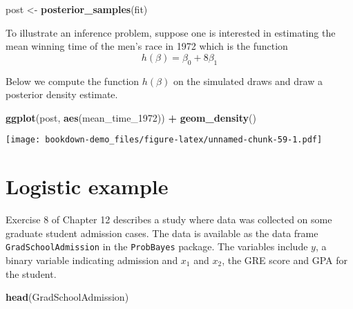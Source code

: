 \documentclass[
]{book}
\newenvironment{Shaded}{\begin{snugshade}}{\end{snugshade}}
\newcommand{\DataTypeTok}[1]{\textcolor[rgb]{0.13,0.29,0.53}{#1}}
\newcommand{\DecValTok}[1]{\textcolor[rgb]{0.00,0.00,0.81}{#1}}
\newcommand{\KeywordTok}[1]{\textcolor[rgb]{0.13,0.29,0.53}{\textbf{#1}}}
\newcommand{\NormalTok}[1]{#1}
\newcommand{\OperatorTok}[1]{\textcolor[rgb]{0.81,0.36,0.00}{\textbf{#1}}}
\newcommand{\StringTok}[1]{\textcolor[rgb]{0.31,0.60,0.02}{#1}}
\begin{document}
\begin{Shaded}
\begin{Highlighting}[]
\NormalTok{post <-}\StringTok{ }\KeywordTok{posterior_samples}\NormalTok{(fit)}
\end{Highlighting}
\end{Shaded}

To illustrate an inference problem, suppose one is interested in estimating the mean winning time of the men's race in 1972 which is the function
\[
h(\beta) = \beta_0 + 8 \beta_1
\]

Below we compute the function \(h(\beta)\) on the simulated draws and draw a posterior density estimate.

\begin{Shaded}
\end{Shaded}

\begin{Shaded}
\begin{Highlighting}[]
\KeywordTok{ggplot}\NormalTok{(post, }\KeywordTok{aes}\NormalTok{(mean_time_}\DecValTok{1972}\NormalTok{)) }\OperatorTok{+}
\StringTok{  }\KeywordTok{geom_density}\NormalTok{()}
\end{Highlighting}
\end{Shaded}

\texttt{[image: bookdown-demo\_files/figure-latex/unnamed-chunk-59-1.pdf]}

\hypertarget{logistic-example}{%
\section{Logistic example}\label{logistic-example}}

Exercise 8 of Chapter 12 describes a study where data was collected on some graduate student admission cases. The data is available as the data frame \texttt{GradSchoolAdmission} in the \texttt{ProbBayes} package. The variables include \(y\), a binary variable indicating admission and \(x_1\) and \(x_2\), the GRE score and GPA for the student.

\begin{Shaded}
\begin{Highlighting}[]
\KeywordTok{head}\NormalTok{(GradSchoolAdmission)}
\end{Highlighting}
\end{Shaded}
\end{document}
